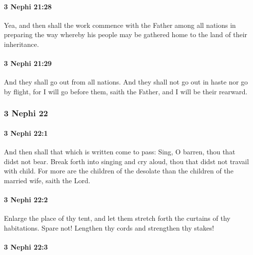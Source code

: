 		\paragraph{3 Nephi 21:28} %
			\label{3NEPHI-21-28}

			Yea, and then shall the work commence with the Father
			among all nations in preparing the way
			whereby his people may be gathered home to the land of their inheritance.

		\paragraph{3 Nephi 21:29} %
			\label{3NEPHI-21-29}

			And they shall go out from all nations.
			And they shall not go out in haste nor go by flight,
			for I will go before them, saith the Father,
			and I will be their rearward.

	\subsubsection{3 Nephi 22} %
		\label{3NEPHI-22}
		
		\paragraph{3 Nephi 22:1} %
			\label{3NEPHI-22-1}

			And then shall that which is written come to pass:
			Sing, O barren,
			thou that didst not bear.
			Break forth into singing and cry aloud,
			thou that didst not travail with child.
			For more are the children of the desolate
			than the children of the married wife, saith the Lord.

		\paragraph{3 Nephi 22:2} %
			\label{3NEPHI-22-2}

			Enlarge the place of thy tent,
			and let them stretch forth the curtains of thy habitations.
			Spare not! Lengthen thy cords and strengthen thy stakes!

		\paragraph{3 Nephi 22:3} %
			\label{3NEPHI-22-3}

